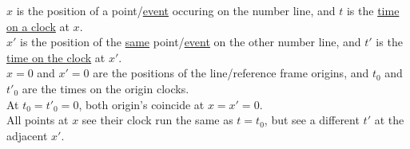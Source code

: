 \documentclass[12pt]{article}
\begin{document}
\vspace{10pt}\noindent
\begin{minipage}[t]{.46\textwidth}
	\scriptsize
	\(x\) is the position of a point/\underline{event} occuring on the number line, and 
	\(t\) is the \underline{time on a clock} at \(x\).\\[5pt]
	\(x'\) is the position of the \underline{same} point/\underline{event} on the other number line, and
	\(t'\) is the \underline{time on the clock} at \(x'\).\\[5pt]
	\(x=0\) and \(x'=0\) are the positions of the line/reference frame origins, and 
	\(t_0\) and \(t'_0\) are the times on the origin clocks.\\[5pt]
	At \(t_0 = t'_0 = 0\), both origin's coincide at \(x=x'=0\).\\[5pt]
	All points at \(x\) see their clock run the same as \(t = t_0\), but see a different \(t'\) at the adjacent \(x'\).
\end{minipage}
\hfill
\end{document}
